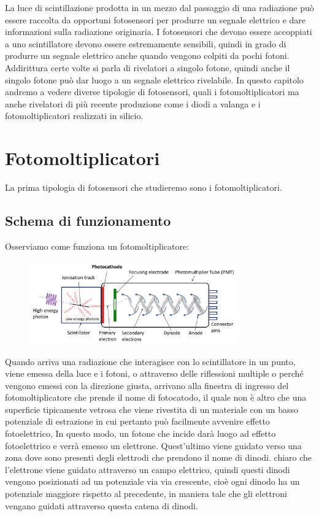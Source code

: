 La luce di scintillazione prodotta in un mezzo dal passaggio di una radiazione può essere raccolta da opportuni fotosensori per produrre un segnale elettrico e dare informazioni sulla radiazione originaria. I fotosensori che devono essere accoppiati a uno scintillatore devono essere estremamente sensibili, quindi in grado di produrre un segnale elettrico anche quando vengono colpiti da pochi fotoni. Addirittura certe volte si parla di rivelatori a singolo fotone, quindi anche il singolo fotone può dar luogo a un segnale elettrico rivelabile. In questo capitolo andremo a vedere diverse tipologie di fotosensori, quali i fotomoltiplicatori ma anche rivelatori di più recente produzione come i diodi a valanga e i fotomoltiplicatori realizzati in silicio.

\section{Fotomoltiplicatori}

La prima tipologia di fotosensori che studieremo sono i fotomoltiplicatori.

\subsection{Schema di funzionamento}

Osserviamo come funziona un fotomoltiplicatore:

\begin{figure}[H]
   \centering
   \includegraphics[width=0.8\textwidth]{immagini/fotomoltiplicatore.png}
\end{figure}

Quando arriva una radiazione che interagisce con lo scintillatore in un punto, viene emessa della luce e i fotoni, o attraverso delle riflessioni multiple o perché vengono emessi con la direzione giusta, arrivano alla finestra di ingresso del fotomoltiplicatore che prende il nome di fotocatodo, il quale non è altro che una superficie tipicamente vetrosa che viene rivestita di un materiale con un basso potenziale di estrazione in cui pertanto può facilmente avvenire effetto fotoelettrico, In questo modo, un fotone che incide darà luogo ad effetto fotoelettrico e verrà emesso un elettrone. Quest'ultimo viene guidato verso una zona dove sono presenti degli elettrodi che prendono il nome di dinodi. \E chiaro che l'elettrone viene guidato attraverso un campo elettrico, quindi questi dinodi vengono posizionati ad un potenziale via via crescente, cioè ogni dinodo ha un potenziale maggiore rispetto al precedente, in maniera tale che gli elettroni vengano guidati attraverso questa catena di dinodi.

